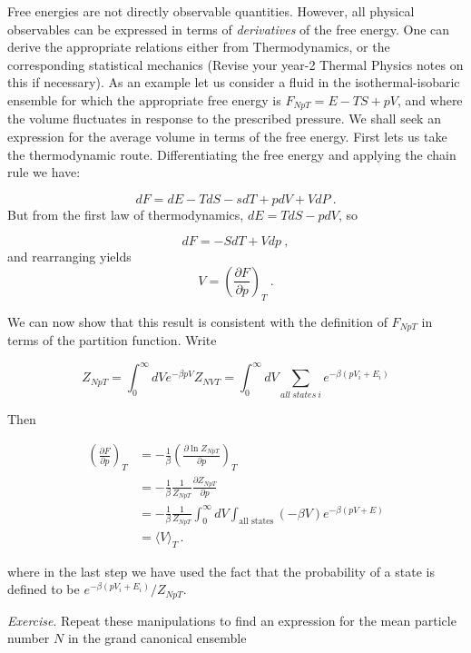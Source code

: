\documentclass[
  letterpaper,
  enabledeprecatedfontcommands]{report}
\begin{document}

Free energies are not directly observable quantities. However, all
physical observables can be expressed in terms of \emph{derivatives} of
the free energy. One can derive the appropriate relations either from
Thermodynamics, or the corresponding statistical mechanics (Revise your
year-2 Thermal Physics notes on this if necessary). As an example let us
consider a fluid in the isothermal-isobaric ensemble for which the
appropriate free energy is \(F_{NpT}=E-TS+pV\), and where the volume
fluctuates in response to the prescribed pressure. We shall seek an
expression for the average volume in terms of the free energy. First
lets us take the thermodynamic route. Differentiating the free energy
and applying the chain rule we have:

\[
dF=dE-TdS-sdT+pdV+VdP\:.
\] But from the first law of thermodynamics, \(dE=TdS-pdV\), so

\[
dF=-SdT+Vdp\:,
\] and rearranging yields \[
V=\left(\frac{\partial F}{\partial p}\right)_T\:.
\]

We can now show that this result is consistent with the definition of
\(F_{NpT}\) in terms of the partition function. Write

\[
Z_{NpT}=\int_0^\infty dV  e^{-\beta p V}Z_{NVT}=\int_0^\infty dV\sum_{all~states~i}e^{-\beta (p V_i+E_i)}
\]

Then

\[
\begin{align}
\left(\frac{\partial F}{\partial p}\right)_T
&= -\frac{1}{\beta} \left(\frac{\partial \ln Z_{NpT}}{\partial p}\right)_T \\
&= -\frac{1}{\beta} \frac{1}{Z_{NpT}} \frac{\partial Z_{NpT}}{\partial p} \\
&= -\frac{1}{\beta} \frac{1}{Z_{NpT}} \int_0^\infty dV \int_{\text{all states}} (-\beta V) e^{-\beta (p V + E)} \\
&= \langle V \rangle_T \,.
\end{align}
\]

where in the last step we have used the fact that the probability of a
state is defined to be \(e^{-\beta (p V_i+E_i)}/Z_{NpT}\).

\emph{Exercise}. Repeat these manipulations to find an expression for
the mean particle number \(N\) in the grand canonical ensemble
\end{document}
